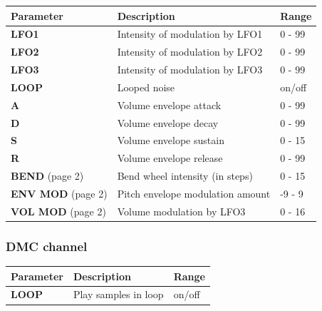 \documentclass[a4paper, 12p, titlepaget]{book}
\begin{document}
\begin{tabular}{l | l | l}
  Parameter & Description & Range\\ \hline
  \textbf{LFO1} & Intensity of modulation by LFO1 & 0 - 99\\
  \textbf{LFO2} & Intensity of modulation by LFO2 & 0 - 99\\
  \textbf{LFO3} & Intensity of modulation by LFO3 & 0 - 99\\
  \textbf{LOOP} & Looped noise & on/off\\
  \textbf{A} & Volume envelope attack & 0 - 99\\
  \textbf{D} & Volume envelope decay & 0 - 99\\
  \textbf{S} & Volume envelope sustain & 0 - 15\\
  \textbf{R} & Volume envelope release & 0 - 99\\
  \textbf{BEND} (page 2) & Bend wheel intensity (in steps) & 0 - 15\\
  \textbf{ENV MOD} (page 2) & Pitch envelope modulation amount & -9 - 9\\
  \textbf{VOL MOD} (page 2) & Volume modulation by LFO3 & 0 - 16\\
\end{tabular}

\subsubsection{DMC channel}


\begin{tabular}{l | l | l}
  Parameter & Description & Range\\ \hline
  \textbf{LOOP} & Play samples in loop & on/off\\
\end{tabular}
\end{document}
